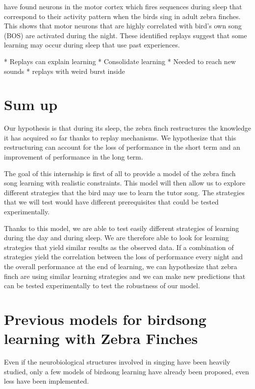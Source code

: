 \documentclass{report}
\begin{document}
\textcite{dave_song_2000} have found neurons in the motor cortex which fires
sequences during sleep that correspond to their activity pattern when the birds
sing in adult zebra finches. This shows that motor neurons that are highly
correlated with bird's own song (BOS) are activated during the night. These
identified replays suggest that some learning may occur during sleep that use
past experiences.

* Replays can explain learning \cite{margoliash_offline_2003}
* Consolidate learning
* Needed to reach new sounds \cite{margoliash_offline_2003}
* replays with weird burst inside \cite{margoliash_evaluating_2002}

\section{Sum up}
Our hypothesis is that during its sleep, the zebra finch restructures the
knowledge it has acquired so far thanks to replay mechanisms. We hypothesize
that this restructuring can account for the loss of performance in the short
term and an improvement of performance in the long term.

The goal of this internship is first of all to provide a model of the zebra
finch song learning with realistic constraints. This model will then allow us to
explore different strategies that the bird may use to learn the tutor song. The
strategies that we will test would have different prerequisites that could be
tested experimentally.

Thanks to this model, we are able to test easily different strategies of
learning during the day and during sleep. We are therefore able to look for
learning strategies that yield similar results as the observed data. If a
combination of strategies yield the correlation between the loss of performance
every night and the overall performance at the end of learning, we can
hypothesize that zebra finch are using similar learning strategies and we can
make new predictions that can be tested experimentally to test the robustness
of our model.

\section{Previous models for birdsong learning with Zebra Finches}

Even if the neurobiological structures involved in singing have been heavily
studied, only a few models of birdsong learning have already been proposed, even
less have been implemented.
\end{document}
